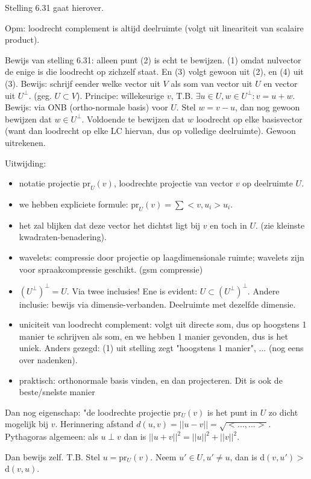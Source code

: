 \documentclass{article}
\begin{document}
Stelling 6.31 gaat hierover. 

Opm: loodrecht complement is altijd deelruimte (volgt uit lineariteit van scalaire product). 

Bewijs van stelling 6.31: alleen punt (2) is echt te bewijzen. (1) omdat nulvector de enige is die loodrecht op zichzelf staat. En (3) volgt gewoon uit (2), en (4) uit (3). 
Bewijs: schrijf eender welke vector uit $V$ als som van vector uit $U$ en vector uit $U^{\perp}$. (geg. $U \subset V$). Principe: willekeurige $v$, T.B. $\exists u \in U, w \in U^{\perp}: v=u+w$.
Bewijs: via ONB (ortho-normale basis) voor $U$. Stel $w=v-u$, dan nog gewoon bewijzen dat $w \in U^{\perp}$. Voldoende te bewijzen dat $w$ loodrecht op elke basisvector (want dan loodrecht op elke LC hiervan, dus op volledige deelruimte). 
Gewoon uitrekenen. 

Uitwijding: 
\begin{itemize}
    \item notatie projectie $\text{pr}_U(v)$, loodrechte projectie van vector $v$ op deelruimte  $U$. 
    \item we hebben expliciete formule: $\text{pr}_U(v) = \sum <v, u_i> u_i$. 
    \item het zal blijken dat deze vector het dichtst ligt bij $v$ en toch in $U$. (zie kleinste kwadraten-benadering). 
    \item wavelets: compressie door projectie op laagdimensionale ruimte; wavelets zijn voor spraakcompressie geschikt. (gsm compressie) 
    \item $(U^{\perp})^\perp = U$. Via twee inclusies! Ene is evident: $U \subset  (U^{\perp})^\perp $. Andere inclusie: bewijs via dimensie-verbanden. Deelruimte met dezelfde dimensie. 
    \item uniciteit van loodrecht complement: volgt uit directe som, dus op hoogstens 1 manier te schrijven als som, en we hebben 1 manier gevonden, dus is het uniek. Anders gezegd: (1) uit stelling zegt "hoogstens 1 manier", ... (nog eens over nadenken). 
    \item praktisch: orthonormale basis vinden, en dan projecteren. Dit is ook de beste/snelste manier
\end{itemize}

Dan nog eigenschap: "de loodrechte projectie pr$_U(v)$ is het punt in $U$ zo dicht mogelijk bij $v$. Herinnering afstand $d(u,v) = || u-v || = \sqrt{ <...,...> }$. 
Pythagoras algemeen: als $u \perp v$ dan is $|| u+v ||^2 = ||u||^2+||v||^2$.

Dan bewijs zelf. 
T.B. Stel $u = $pr$_U(v)$. Neem $u' \in U, u' \neq u$, dan is d$(v,u') >$ d$(v,u)$. 
\end{document}
